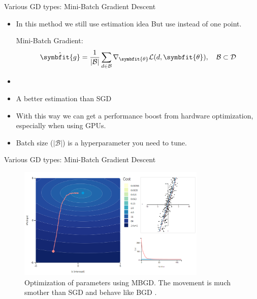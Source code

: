 \begin{frame}{Various GD types: Mini-Batch Gradient Descent}
	\begin{itemize}
		\item In this method we still use estimation idea But use  instead of one point.
		\begin{block}{Mini-Batch Gradient:}
			\[
			\hat{\symbfit{g}} = \frac{1}{|\mathcal{B}|} \sum_{d\in\mathcal{B}} \nabla_{\symbfit{\theta}} \mathcal{L}(d, \symbfit{\theta}), \quad \mathcal{B} \subset \mathcal{D}
			\]
		\end{block}
		\item[]
		\item A better estimation than SGD
		\item With this way we can get a performance boost from hardware optimization, especially when using GPUs.
		\item Batch size ($|\mathcal{B}|$) is a hyperparameter you need to tune.
	\end{itemize}
\end{frame}

\begin{frame}{Various GD types: Mini-Batch Gradient Descent}
	\begin{figure}[H]
		\centering
		\includegraphics[width=0.8\textwidth]{Images/mbgd.png}
		\caption{Optimization of parameters using MBGD. The movement is much smother than SGD and behave like BGD \cite{katanforoosh-kunin-opt}.}
	\end{figure} 
\end{frame}

